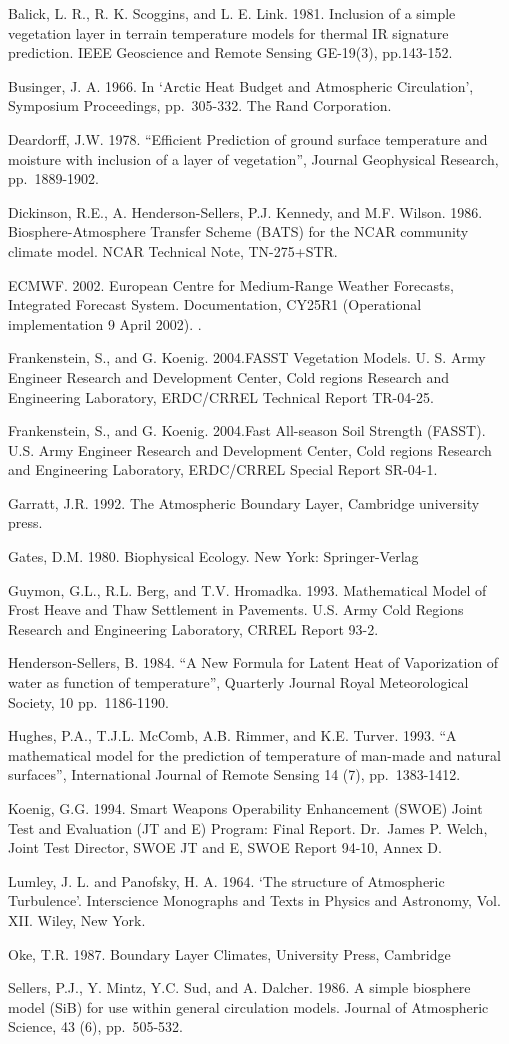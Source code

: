 Balick, L. R., R. K. Scoggins, and L. E. Link. 1981. Inclusion of a simple vegetation layer in terrain temperature models for thermal IR signature prediction. IEEE Geoscience and Remote Sensing GE-19(3), pp.143-152.

Businger, J. A. 1966. In `Arctic Heat Budget and Atmospheric Circulation', Symposium Proceedings, pp.~305-332. The Rand Corporation.

Deardorff, J.W. 1978. ``Efficient Prediction of ground surface temperature and moisture with inclusion of a layer of vegetation'', Journal Geophysical Research, pp.~1889-1902.

Dickinson, R.E., A. Henderson-Sellers, P.J. Kennedy, and M.F. Wilson. 1986. Biosphere-Atmosphere Transfer Scheme (BATS) for the NCAR community climate model. NCAR Technical Note, TN-275+STR.

ECMWF. 2002. European Centre for Medium-Range Weather Forecasts, Integrated Forecast System. Documentation, CY25R1 (Operational implementation 9 April 2002). .

Frankenstein, S., and G. Koenig. 2004.FASST Vegetation Models. U. S. Army Engineer Research and Development Center, Cold regions Research and Engineering Laboratory, ERDC/CRREL Technical Report TR-04-25.

Frankenstein, S., and G. Koenig. 2004.Fast All-season Soil Strength (FASST). U.S. Army Engineer Research and Development Center, Cold regions Research and Engineering Laboratory, ERDC/CRREL Special Report SR-04-1.

Garratt, J.R. 1992. The Atmospheric Boundary Layer, Cambridge university press.

Gates, D.M. 1980. Biophysical Ecology. New York: Springer-Verlag

Guymon, G.L., R.L. Berg, and T.V. Hromadka. 1993. Mathematical Model of Frost Heave and Thaw Settlement in Pavements. U.S. Army Cold Regions Research and Engineering Laboratory, CRREL Report 93-2.

Henderson-Sellers, B. 1984. ``A New Formula for Latent Heat of Vaporization of water as function of temperature'', Quarterly Journal Royal Meteorological Society, 10 pp.~1186-1190.

Hughes, P.A., T.J.L. McComb, A.B. Rimmer, and K.E. Turver. 1993. ``A mathematical model for the prediction of temperature of man-made and natural surfaces'', International Journal of Remote Sensing 14 (7), pp.~1383-1412.

Koenig, G.G. 1994. Smart Weapons Operability Enhancement (SWOE) Joint Test and Evaluation (JT and E) Program: Final Report. Dr.~James P. Welch, Joint Test Director, SWOE JT and E, SWOE Report 94-10, Annex D.

Lumley, J. L. and Panofsky, H. A. 1964. `The structure of Atmospheric Turbulence'. Interscience Monographs and Texts in Physics and Astronomy, Vol. XII. Wiley, New York.

Oke, T.R. 1987. Boundary Layer Climates, University Press, Cambridge

Sellers, P.J., Y. Mintz, Y.C. Sud, and A. Dalcher. 1986. A simple biosphere model (SiB) for use within general circulation models. Journal of Atmospheric Science, 43 (6), pp.~505-532.
